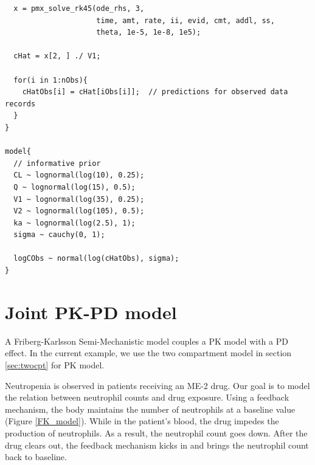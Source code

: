 \documentclass[10pt, reqno, oneside]{amsbook}
\numberwithin{equation}{chapter}
\numberwithin{figure}{chapter}
\numberwithin{table}{chapter}
\theoremstyle{remark}
\begin{document}
\begin{verbatim}
  x = pmx_solve_rk45(ode_rhs, 3,
                     time, amt, rate, ii, evid, cmt, addl, ss,
                     theta, 1e-5, 1e-8, 1e5);

  cHat = x[2, ] ./ V1;

  for(i in 1:nObs){
    cHatObs[i] = cHat[iObs[i]];  // predictions for observed data records
  }
}

model{
  // informative prior
  CL ~ lognormal(log(10), 0.25);
  Q ~ lognormal(log(15), 0.5);
  V1 ~ lognormal(log(35), 0.25);
  V2 ~ lognormal(log(105), 0.5);
  ka ~ lognormal(log(2.5), 1);
  sigma ~ cauchy(0, 1);

  logCObs ~ normal(log(cHatObs), sigma);
}
\end{verbatim}

\section{Joint PK-PD model}
\label{sec:org23ccdab}

A Friberg-Karlsson Semi-Mechanistic model \cite{friberg_mechanistic_2003} couples
a PK model with a PD
effect. In the current example, we use the two compartment model in section \ref{sec:twocpt} for
PK model.

Neutropenia is observed in patients receiving an ME-2 drug. Our goal
is to model the relation between neutrophil counts and drug
exposure. Using a feedback mechanism, the body maintains the number of
neutrophils at a baseline value (Figure \ref{FK_model}). While in the
patient's blood, the drug impedes the production of neutrophils. As a
result, the neutrophil count goes down. After the drug clears out, the
feedback mechanism kicks in and brings the neutrophil count back to
baseline.
\end{document}
